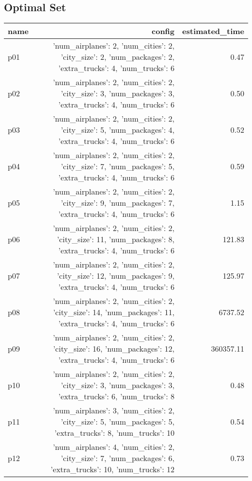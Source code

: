 \documentclass{article}
\begin{document}
                                \subsection*{Optimal Set}
                                
                            \begin{center}
                            \scriptsize
                            \begin{tabular}{@{}l|r|r@{}}
                            name & config & estimated\_time\\\midrule
                              p01&{'num\_airplanes': 2, 'num\_cities': 2, 'city\_size': 2, 'num\_packages': 2, 'extra\_trucks': 4, 'num\_trucks': 6}&0.47\\
  p02&{'num\_airplanes': 2, 'num\_cities': 2, 'city\_size': 3, 'num\_packages': 3, 'extra\_trucks': 4, 'num\_trucks': 6}&0.50\\
  p03&{'num\_airplanes': 2, 'num\_cities': 2, 'city\_size': 5, 'num\_packages': 4, 'extra\_trucks': 4, 'num\_trucks': 6}&0.52\\
  p04&{'num\_airplanes': 2, 'num\_cities': 2, 'city\_size': 7, 'num\_packages': 5, 'extra\_trucks': 4, 'num\_trucks': 6}&0.59\\
  p05&{'num\_airplanes': 2, 'num\_cities': 2, 'city\_size': 9, 'num\_packages': 7, 'extra\_trucks': 4, 'num\_trucks': 6}&1.15\\
  p06&{'num\_airplanes': 2, 'num\_cities': 2, 'city\_size': 11, 'num\_packages': 8, 'extra\_trucks': 4, 'num\_trucks': 6}&121.83\\
  p07&{'num\_airplanes': 2, 'num\_cities': 2, 'city\_size': 12, 'num\_packages': 9, 'extra\_trucks': 4, 'num\_trucks': 6}&125.97\\
  p08&{'num\_airplanes': 2, 'num\_cities': 2, 'city\_size': 14, 'num\_packages': 11, 'extra\_trucks': 4, 'num\_trucks': 6}&6737.52\\
  p09&{'num\_airplanes': 2, 'num\_cities': 2, 'city\_size': 16, 'num\_packages': 12, 'extra\_trucks': 4, 'num\_trucks': 6}&360357.11\\
  p10&{'num\_airplanes': 2, 'num\_cities': 2, 'city\_size': 3, 'num\_packages': 3, 'extra\_trucks': 6, 'num\_trucks': 8}&0.48\\
  p11&{'num\_airplanes': 3, 'num\_cities': 2, 'city\_size': 5, 'num\_packages': 5, 'extra\_trucks': 8, 'num\_trucks': 10}&0.54\\
  p12&{'num\_airplanes': 4, 'num\_cities': 2, 'city\_size': 7, 'num\_packages': 6, 'extra\_trucks': 10, 'num\_trucks': 12}&0.73\\

\end{tabular}
\end{center}
\end{document}
